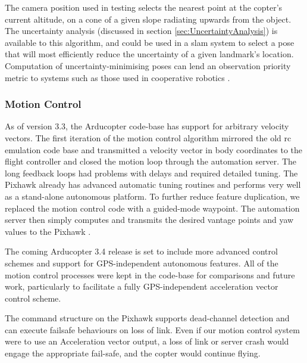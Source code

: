\documentclass[a4paper, 11pt, titlepage]{article}
\begin{document}
      The camera position used in testing selects the nearest point at the copter's current altitude, on a cone of a given slope radiating upwards from the object.
      The uncertainty analysis (discussed in section \ref{sec:UncertaintyAnalysis}) is available to this algorithm, and could be used in a \gls{slam} system to select a pose that will most efficiently reduce the uncertainty of a given landmark's location.  Computation of uncertainty-minimising poses can lend an observation priority metric to systems such as those used in cooperative robotics \cite{TrilatUnderwater}.

    \subsubsection{Motion Control}
      As of version 3.3, the Arducopter code-base has support for arbitrary velocity vectors.  The first iteration of the motion control algorithm mirrored the old \gls{rc} emulation code base and transmitted a velocity vector in body coordinates to the flight controller and closed the motion loop through the automation server.  The long feedback loops had problems with delays and required detailed tuning.
      The Pixhawk \cite{3dr-pixhawk} already has advanced automatic tuning routines and performs very well as a stand-alone autonomous platform.
      To further reduce feature duplication, we replaced the motion control code with a guided-mode waypoint.  The automation server then simply computes and transmits the desired vantage points and yaw values to the Pixhawk \cite{3dr-pixhawk}.

      The coming Arducopter 3.4 release is set to include more advanced control schemes and support for GPS-independent autonomous features.  All of the motion control processes were kept in the code-base for comparisons and future work, particularly to facilitate a fully GPS-independent acceleration vector control scheme.

      The command structure on the Pixhawk \cite{3dr-pixhawk} supports dead-channel detection and can execute failsafe behaviours on loss of link.  Even if our motion control system were to use an Acceleration vector output, a loss of link or server crash would engage the appropriate fail-safe, and the copter would continue flying.
\end{document}
